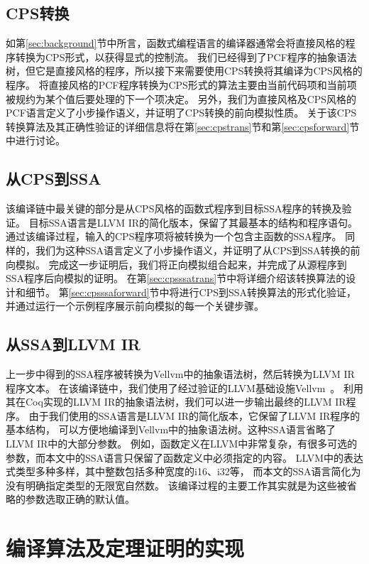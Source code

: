 \subsection{CPS转换}

如第\ref{sec:background}节中所言，函数式编程语言的编译器通常会将直接风格的程序转换为CPS形式，以获得显式的控制流。
我们已经得到了PCF程序的抽象语法树，但它是直接风格的程序，所以接下来需要使用CPS转换将其编译为CPS风格的程序。
将直接风格的PCF程序转换为CPS形式的算法主要由当前代码项和当前项被规约为某个值后要处理的下一个项决定。
另外，我们为直接风格及CPS风格的PCF语言定义了小步操作语义，并证明了CPS转换的前向模拟性质。
关于该CPS转换算法及其正确性验证的详细信息将在第\ref{sec:cpstrans}节和第\ref{sec:cpsforward}节中进行讨论。

\subsection{从CPS到SSA}

该编译链中最关键的部分是从CPS风格的函数式程序到目标SSA程序的转换及验证。
目标SSA语言是LLVM IR的简化版本，保留了其最基本的结构和程序语句。
通过该编译过程，输入的CPS程序项将被转换为一个包含主函数的SSA程序。
同样的，我们为这种SSA语言定义了小步操作语义，并证明了从CPS到SSA转换的前向模拟。
完成这一步证明后，我们将正向模拟组合起来，并完成了从源程序到SSA程序后向模拟的证明。
在第\ref{sec:cpsssatrans}节中将详细介绍该转换算法的设计和细节。
第\ref{sec:cpsssaforward}节中将进行CPS到SSA转换算法的形式化验证，并通过运行一个示例程序展示前向模拟的每一个关键步骤。

\subsection{从SSA到LLVM IR}

上一步中得到的SSA程序被转换为Vellvm中的抽象语法树，然后转换为LLVM IR程序文本。
在该编译链中，我们使用了经过验证的LLVM基础设施Vellvm~\cite{zakowski2021modular}。
利用其在Coq实现的LLVM IR的抽象语法树，我们可以进一步输出最终的LLVM IR程序。
由于我们使用的SSA语言是LLVM IR的简化版本，它保留了LLVM IR程序的基本结构，
可以方便地编译到Vellvm中的抽象语法树。这种SSA语言省略了LLVM IR中的大部分参数。
例如，函数定义在LLVM中非常复杂，有很多可选的参数，而本文中的SSA语言只保留了函数定义中必须指定的内容。
LLVM中的表达式类型多种多样，其中整数包括多种宽度的i16、i32等，
而本文的SSA语言简化为没有明确指定类型的无限宽自然数。
该编译过程的主要工作其实就是为这些被省略的参数选取正确的默认值。


\section{编译算法及定理证明的实现}

